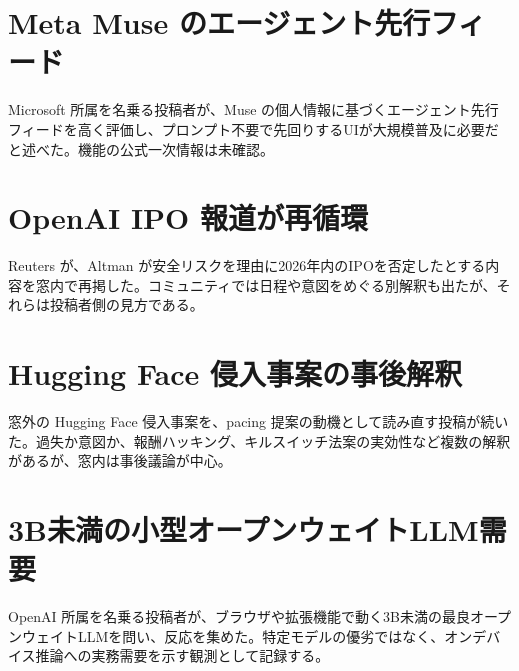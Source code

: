 \section{Meta Muse のエージェント先行フィード}
Microsoft 所属を名乗る投稿者が、Muse の個人情報に基づくエージェント先行フィードを高く評価し、プロンプト不要で先回りするUIが大規模普及に必要だと述べた。機能の公式一次情報は未確認。

\section{OpenAI IPO 報道が再循環}
Reuters が、Altman が安全リスクを理由に2026年内のIPOを否定したとする内容を窓内で再掲した。コミュニティでは日程や意図をめぐる別解釈も出たが、それらは投稿者側の見方である。

\section{Hugging Face 侵入事案の事後解釈}
窓外の Hugging Face 侵入事案を、pacing 提案の動機として読み直す投稿が続いた。過失か意図か、報酬ハッキング、キルスイッチ法案の実効性など複数の解釈があるが、窓内は事後議論が中心。

\section{3B未満の小型オープンウェイトLLM需要}
OpenAI 所属を名乗る投稿者が、ブラウザや拡張機能で動く3B未満の最良オープンウェイトLLMを問い、反応を集めた。特定モデルの優劣ではなく、オンデバイス推論への実務需要を示す観測として記録する。

